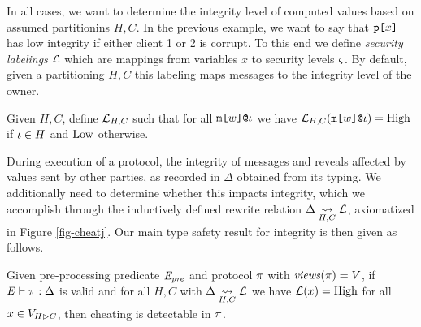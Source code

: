 In all cases, we want to determine the integrity level of computed
values based on assumed partitionins $H,C$. In the previous example,
we want to say that $\texttt{p[}x\texttt{]}$ has low integrity if either client 1 or
2 is corrupt.  To this end we define \emph{security labelings}
$\mathcal{L}$ which are mappings from variables $x$ to security levels
$\varsigma$. By default, given a partitioning $H,C$ this labeling maps
messages to the integrity level of the owner.
\begin{definition}  
  Given $H,C$,
  define $\mathcal{L}_{H,C}$ such that for all $\texttt{m[}w\texttt{]}\texttt{@}\iota$ we
  have $\mathcal{L}_{H,C}(\texttt{m[}w\texttt{]}\texttt{@}\iota ) = \mathrm{High}$ if $\iota \in H$ and $\mathrm{Low}$
  otherwise.
\end{definition}
During execution of a protocol, the integrity of messages and reveals
affected by values sent by other parties, as recorded in $\Delta$
obtained from its typing. We additionally need to determine
whether this impacts integrity, which we accomplish through
the inductively defined rewrite relation $\Delta \underset{H,C}{\leadsto} \mathcal{L}$,
axiomatized in Figure \ref{fig-cheatj}.
Our main type safety result for integrity is then given as follows.
\begin{theorem}
  Given pre-processing predicate $\mathit{E}_{\mathit{pre}}$ and protocol $\pi$ with
  $\mathit{views}(\pi) = V$, if
  $\mathit{E} \vdash \pi : \Delta$ is valid
  and for all $H,C$ with $\Delta \underset{H,C}{\leadsto} \mathcal{L}$ 
  we have $\mathcal{L}(x) = \mathrm{High}$ for all $x \in V_{H \rhd C}$, then cheating
  is detectable in $\pi$.
\end{theorem}
